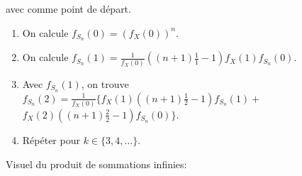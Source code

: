 \documentclass[10pt, french]{article}
\begin{document}
\begin{multicols*}{2}
\begin{algo2}
avec  comme point de départ.

\tcbline

\begin{enumerate}
	\item	On calcule $f_{S_{n}}(0)	=	\left(f_{X}(0)\right)^{n}$.
	\item	On calcule $f_{S_{n}}(1)	=	\frac{1}{f_{X}(0)} \left((n + 1)\frac{1}{1} - 1\right)f_{X}(1)f_{S_{n}}(0)$.
	\item	Avec $f_{S_{n}}(1)$, on trouve $f_{S_{n}}(2)	=	\frac{1}{f_{X}(0)} \bigg\{ f_{X}(1)\left((n + 1)\frac{1}{2} - 1\right)f_{S_{n}}(1)	+$ $ f_{X}(2)\left((n + 1)\frac{2}{2} - 1\right)f_{S_{n}}(0) \bigg\}$.
	\item	Répéter pour $k \in \{3, 4, \dots\}$.
\end{enumerate}
\end{algo2}

Visuel du produit de sommations infinies: 
\begin{center}



\begin{tikzpicture}[x=0.75pt,y=0.75pt,yscale=-1,xscale=1]


\end{tikzpicture}
\end{center}
\end{multicols*}
\end{document}

